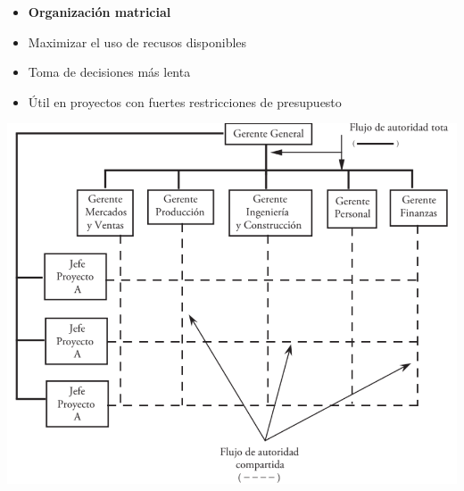 \documentclass{article} %
\begin{document}
\begin{minipage}{0.45\textwidth}
    \begin{itemize}
        \item \textbf{Organización matricial}
        \item Maximizar el uso de recusos disponibles
        \item Toma de decisiones más lenta
        \item Útil en proyectos con fuertes restricciones de presupuesto
    \end{itemize}
\end{minipage}
\hfill
\begin{minipage}{0.5\textwidth}
    \centering
    \includegraphics[width=1\textwidth]{matriz_proyecto.png}
\end{minipage}
\end{document}
